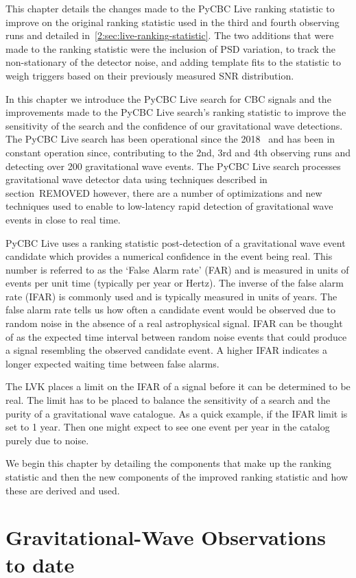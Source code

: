 This chapter details the changes made to the PyCBC Live ranking statistic to improve on the original ranking statistic used in the third and fourth observing runs and detailed in~\ref{2:sec:live-ranking-statistic}. The two additions that were made to the ranking statistic were the inclusion of PSD variation, to track the non-stationary of the detector noise, and adding template fits to the statistic to weigh triggers based on their previously measured SNR distribution.

In this chapter we introduce the PyCBC Live search for CBC signals and the improvements made to the PyCBC Live search's ranking statistic to improve the sensitivity of the search and the confidence of our gravitational wave detections. The PyCBC Live search has been operational since the 2018~\cite{PyCBC_Live:2018} and has been in constant operation since, contributing to the 2nd, 3rd and 4th observing runs and detecting over 200 gravitational wave events. The PyCBC Live search processes gravitational wave detector data using techniques described in section~REMOVED however, there are a number of optimizations and new techniques used to enable to low-latency rapid detection of gravitational wave events in close to real time.

PyCBC Live uses a ranking statistic post-detection of a gravitational wave event candidate which provides a numerical confidence in the event being real. This number is referred to as the `False Alarm rate' (FAR) and is measured in units of events per unit time (typically per year or Hertz). The inverse of the false alarm rate (IFAR) is commonly used and is typically measured in units of years. The false alarm rate tells us how often a candidate event would be observed due to random noise in the absence of a real astrophysical signal. IFAR can be thought of as the expected time interval between random noise events that could produce a signal resembling the observed candidate event. A higher IFAR indicates a longer expected waiting time between false alarms.

The LVK places a limit on the IFAR of a signal before it can be determined to be real. The limit has to be placed to balance the sensitivity of a search and the purity of a gravitational wave catalogue. As a quick example, if the IFAR limit is set to 1 year. Then one might expect to see one event per year in the catalog purely due to noise.

We begin this chapter by detailing the components that make up the ranking statistic and then the new components of the improved ranking statistic and how these are derived and used.

\section{\label{2:sec:current-detections}Gravitational-Wave Observations to date}
